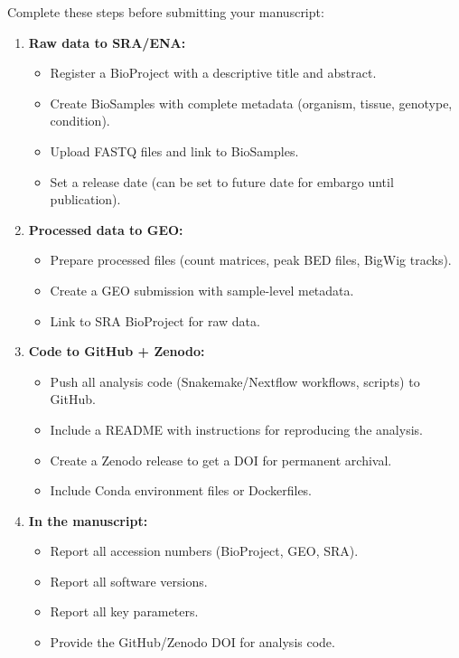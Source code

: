 \begin{protocolbox}[title={Pre-Publication Data Submission Checklist}]
Complete these steps before submitting your manuscript:
\begin{enumerate}[itemsep=3pt]
  \item \textbf{Raw data to SRA/ENA:}
  \begin{itemize}[nosep]
    \item Register a BioProject with a descriptive title and abstract.
    \item Create BioSamples with complete metadata (organism, tissue, genotype, condition).
    \item Upload FASTQ files and link to BioSamples.
    \item Set a release date (can be set to future date for embargo until publication).
  \end{itemize}

  \item \textbf{Processed data to GEO:}
  \begin{itemize}[nosep]
    \item Prepare processed files (count matrices, peak BED files, BigWig tracks).
    \item Create a GEO submission with sample-level metadata.
    \item Link to SRA BioProject for raw data.
  \end{itemize}

  \item \textbf{Code to GitHub + Zenodo:}
  \begin{itemize}[nosep]
    \item Push all analysis code (Snakemake/Nextflow workflows, scripts) to GitHub.
    \item Include a README with instructions for reproducing the analysis.
    \item Create a Zenodo release to get a DOI for permanent archival.
    \item Include Conda environment files or Dockerfiles.
  \end{itemize}

  \item \textbf{In the manuscript:}
  \begin{itemize}[nosep]
    \item Report all accession numbers (BioProject, GEO, SRA).
    \item Report all software versions.
    \item Report all key parameters.
    \item Provide the GitHub/Zenodo DOI for analysis code.
  \end{itemize}
\end{enumerate}
\end{protocolbox}

